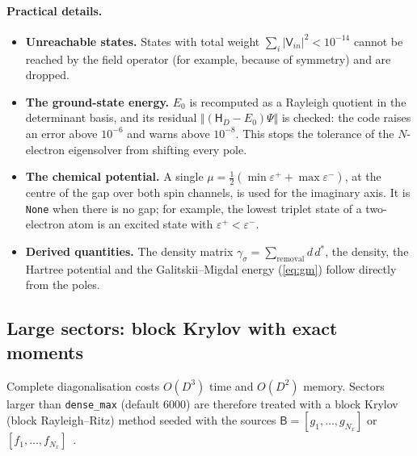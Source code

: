 \documentclass[11pt,a4paper]{article}
\newcommand{\code}[1]{\texttt{#1}}
\newcommand{\mat}[1]{\mathsf{#1}}
\newcommand{\Nx}{N_x}
\begin{document}
\paragraph{Practical details.}
\begin{itemize}
\item \textbf{Unreachable states.} States with total weight $\sum_i|\mat V_{in}|^2<10^{-14}$ cannot be reached by the field operator (for example, because of symmetry) and are dropped.
\item \textbf{The ground-state energy.} $E_0$ is recomputed as a Rayleigh quotient in the determinant basis, and its residual $\Vert(\mat H_D-E_0)\Psi\Vert$ is checked: the code raises an error above $10^{-6}$ and warns above $10^{-8}$. This stops the tolerance of the $N$-electron eigensolver from shifting every pole.
\item \textbf{The chemical potential.} A single $\mu = \tfrac12(\min\varepsilon^+ + \max\varepsilon^-)$, at the centre of the gap over both spin channels, is used for the imaginary axis. It is \code{None} when there is no gap; for example, the lowest triplet state of a two-electron atom is an excited state with $\varepsilon^+<\varepsilon^-$.
\item \textbf{Derived quantities.} The density matrix $\gamma_\sigma = \sum_\text{removal}d\,d^*$, the density, the Hartree potential and the Galitskii--Migdal energy (\cref{eq:gm}) follow directly from the poles.
\end{itemize}

\subsection{Large sectors: block Krylov with exact moments}
\label{sec:krylov}

Complete diagonalisation costs $O(D^3)$ time and $O(D^2)$ memory. Sectors larger than \code{dense\_max} (default $6000$) are therefore treated with a block Krylov (block Rayleigh--Ritz) method seeded with the sources $\mat B = [g_1,\dots,g_{\Nx}]$ or $[f_1,\dots,f_{\Nx}]$~\cite{golub1977,dagotto1994}.
\end{document}

